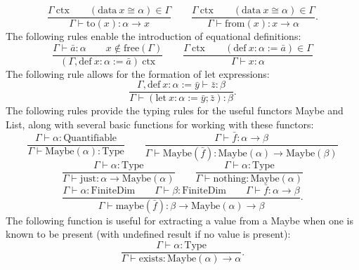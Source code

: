 \documentclass[11pt]{article}
\begin{document}
\begin{equation}
	\frac{\Gamma\ \text{ctx} \qquad
	(\text{data}\ x \cong \alpha) \in \Gamma}
	{\Gamma \vdash \text{to}(x) : \alpha \to x}
	\qquad
	\frac{\Gamma\ \text{ctx} \qquad
	(\text{data}\ x \cong \alpha) \in \Gamma}
	{\Gamma \vdash \text{from}(x) : x \to \alpha}.
\end{equation}
The following rules enable the introduction of equational
definitions:
\begin{equation}
	\frac{\Gamma \vdash \bar{a} : \alpha
	\qquad x \notin \text{free}(\Gamma)}
	{(\Gamma, \text{def}\ x : \alpha := \bar{a})\ \text{ctx}}
	\qquad
	\frac{\Gamma\ \text{ctx}
	\qquad (\text{def}\ x : \alpha := \bar{a}) \in \Gamma}
	{\Gamma \vdash x : \alpha}
\end{equation}
The following rule allows for the formation of let expressions:
\begin{equation}
	\frac{\Gamma, \text{def}\ x : \alpha := \bar{y} \vdash \bar{z} : \beta}
	{\Gamma \vdash
	 (\text{let}\ x : \alpha := \bar{y}; \bar{z}) : \beta}.
\end{equation}
The following rules provide the typing rules for the useful
functors Maybe and List, along
with several basic functions for working with these functors:
\begin{equation}
	\frac{\Gamma \vdash \alpha : \text{Quantifiable}}
	{\Gamma \vdash \text{Maybe}(\alpha) : \text{Type}}
	\qquad
	\frac{\Gamma \vdash \bar{f} : \alpha \to \beta}
	{\Gamma \vdash \text{Maybe}(\bar{f}) : \text{Maybe}(\alpha) \to \text{Maybe}(\beta)}
\end{equation}
\begin{equation}
	\frac{\Gamma \vdash \alpha : \text{Type}}
	{\Gamma \vdash \text{just} : \alpha \to \text{Maybe}(\alpha)}
	\qquad
	\frac{\Gamma \vdash \alpha : \text{Type}}
	{\Gamma \vdash \text{nothing} : \text{Maybe}(\alpha)}
\end{equation}
\begin{equation}
	\frac{\Gamma \vdash \alpha : \text{FiniteDim}
	\qquad \Gamma \vdash \beta : \text{FiniteDim}
	\qquad \Gamma \vdash \bar{f} : \alpha \to \beta}
	{\Gamma \vdash \text{maybe}(\bar{f}) : \beta \to \text{Maybe}(\alpha) \to \beta}.
\end{equation}
The following function is useful for extracting a value from a Maybe when one is known to be present
(with undefined result if no value is present):
\begin{equation}
	\frac{\Gamma \vdash \alpha : \text{Type}}
	{\Gamma \vdash \text{exists} : \text{Maybe}(\alpha) \to \alpha}.
\end{equation}
\end{document}
